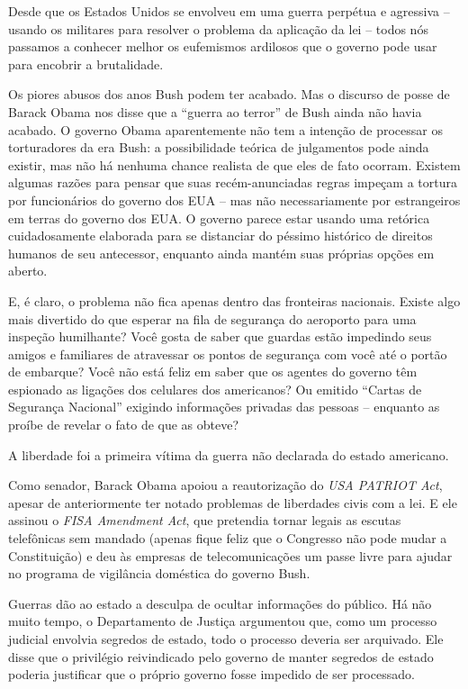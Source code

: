 Desde que os Estados Unidos se envolveu em uma guerra perpétua e agressiva -- usando os militares para resolver o problema da aplicação da lei -- todos nós passamos a conhecer melhor os eufemismos ardilosos que o governo pode usar para encobrir a brutalidade.

Os piores abusos dos anos Bush podem ter acabado. Mas o discurso de posse de Barack Obama nos disse que a ``guerra ao terror'' de Bush ainda não havia acabado. O governo Obama aparentemente não tem a intenção de processar os torturadores da era Bush: a possibilidade teórica de julgamentos pode ainda existir, mas não há nenhuma chance realista de que eles de fato ocorram. Existem algumas razões para pensar que suas recém-anunciadas regras impeçam a tortura por funcionários do governo dos EUA -- mas não necessariamente por estrangeiros em terras do governo dos EUA. O governo parece estar usando uma retórica cuidadosamente elaborada para se distanciar do péssimo histórico de direitos humanos de seu antecessor, enquanto ainda mantém suas próprias opções em aberto. 

E, é claro, o problema não fica apenas dentro das fronteiras nacionais. Existe algo mais divertido do que esperar na fila de segurança do aeroporto para uma inspeção humilhante? Você gosta de saber que guardas estão impedindo seus amigos e familiares de atravessar os pontos de segurança com você até o portão de embarque? Você não está feliz em saber que os agentes do governo têm espionado as ligações dos celulares dos americanos? Ou emitido ``Cartas de Segurança Nacional'' exigindo informações privadas das pessoas -- enquanto as proíbe de revelar o fato de que as obteve?

A liberdade foi a primeira vítima da guerra não declarada do estado americano.

Como senador, Barack Obama apoiou a reautorização do \emph{USA PATRIOT Act}, apesar de anteriormente ter notado problemas de liberdades civis com a lei. E ele assinou o \emph{FISA Amendment Act}, que pretendia tornar legais as escutas telefônicas sem mandado (apenas fique feliz que o Congresso não pode mudar a Constituição) e deu às empresas de telecomunicações um passe livre para ajudar no programa de vigilância doméstica do governo Bush.

Guerras dão ao estado a desculpa de ocultar informações do público. Há não muito tempo, o Departamento de Justiça argumentou que, como um processo judicial envolvia segredos de estado, todo o processo deveria ser arquivado. Ele disse que o privilégio reivindicado pelo governo de manter segredos de estado poderia justificar que o próprio governo fosse impedido de ser processado.

